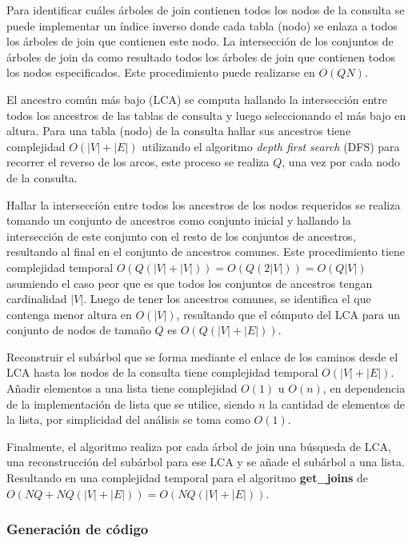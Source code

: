 Para identificar cu\'ales \'arboles de join contienen todos los nodos de la consulta se puede implementar un índice 
inverso donde cada tabla (nodo) se enlaza a todos los árboles de join que contienen 
este nodo. La intersección de los conjuntos de árboles de join da como resultado todos los árboles de join 
que contienen todos los nodos especificados. Este procedimiento puede realizarse en $O(QN)$. 

El ancestro común más bajo (LCA) se computa hallando la intersección entre todos los ancestros de las tablas de consulta y luego 
seleccionando el m\'as bajo en altura. Para una tabla (nodo) de la consulta hallar sus ancestros 
tiene complejidad $O(|V| + |E|)$ utilizando el algoritmo \emph{depth first search} (DFS) para recorrer el reverso de los arcos, 
este proceso se realiza $Q$, una vez por cada nodo de la consulta. 

Hallar la intersección 
entre todos los ancestros de los nodos requeridos se realiza tomando un conjunto de ancestros 
como conjunto inicial y hallando la intersección de este conjunto con el resto de los conjuntos de ancestros, 
resultando al final en el conjunto de ancestros comunes. Este procedimiento tiene complejidad temporal 
$O(Q(|V| + |V|)) = O(Q(2|V|)) = O(Q|V|)$ asumiendo el caso peor que es que todos los conjuntos de ancestros 
tengan cardinalidad $|V|$. Luego de tener los ancestros comunes, se identifica el que contenga menor altura 
en $O(|V|)$, resultando que el cómputo del LCA para un conjunto de nodos de tamaño $Q$ es $O(Q(|V| + |E|))$.

Reconstruir el sub\'arbol que se forma mediante el enlace de los caminos desde el LCA hasta los nodos 
de la consulta tiene complejidad temporal $O(|V| + |E|)$. Añadir elementos a una lista tiene complejidad 
$O(1)$ u $O(n)$, en dependencia de la implementación de lista que se utilice, siendo $n$ la cantidad 
de elementos de la lista, por simplicidad del análisis se toma como $O(1)$.

Finalmente, el algoritmo realiza por cada \'arbol de join una búsqueda de LCA, una reconstrucción 
del sub\'arbol para ese LCA y se añade el sub\'arbol a una lista. Resultando en una complejidad 
temporal para el algoritmo \textbf{get\_joins} de $O(NQ + NQ(|V| + |E|)) = O(NQ(|V| + |E|))$.


\subsubsection{Generaci\'on de c\'odigo}

